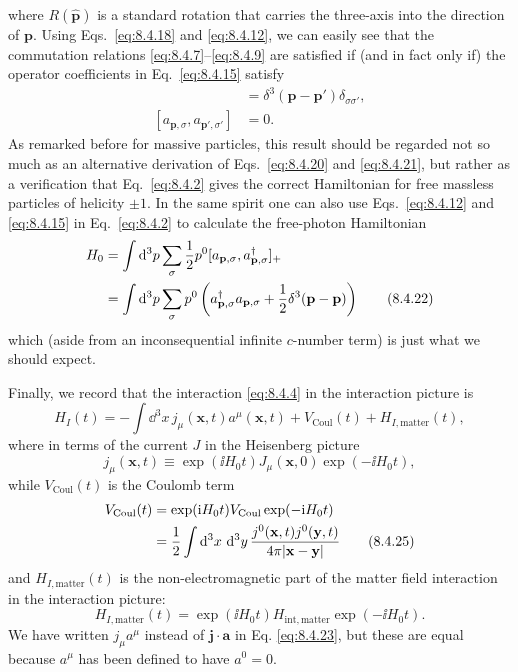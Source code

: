 where $R(\widehat{\mathbf p})$ is a standard rotation that carries the
three-axis into the direction of $\mathbf p$. Using Eqs.~\eqref{eq:8.4.18} and
\eqref{eq:8.4.12}, we can easily see that the commutation relations
\eqref{eq:8.4.7}--\eqref{eq:8.4.9} are satisfied if (and in fact only if) the operator
coefficients in Eq.~\eqref{eq:8.4.15} satisfy
\begin{align}
[a_{\mathbf p,\sigma},a^\dagger_{\mathbf p',\sigma'}]
&=\delta^3(\mathbf p-\mathbf p')\delta_{\sigma\sigma'},
\tag{8.4.20}\label{eq:8.4.20}\\
[a_{\mathbf p,\sigma},a_{\mathbf p',\sigma'}]&=0.
\tag{8.4.21}\label{eq:8.4.21}
\end{align}
As remarked before for massive particles, this result should be regarded not
so much as an alternative derivation of Eqs.~\eqref{eq:8.4.20} and \eqref{eq:8.4.21}, but rather
as a verification that Eq.~\eqref{eq:8.4.2} gives the correct Hamiltonian for free
massless particles of helicity $\mathord\pm1$. In the same spirit one can also
use Eqs.~\eqref{eq:8.4.12} and \eqref{eq:8.4.15} in Eq.~\eqref{eq:8.4.2} to calculate the free-photon
Hamiltonian
\begin{align}
H_0
&=\int \mathop{}\!\mathrm{d}^3p\sum_\sigma\frac12p^0
  [a_{\mathbf p,\sigma},a^\dagger_{\mathbf p,\sigma}]_+
\notag\\
&=\int \mathop{}\!\mathrm{d}^3p\sum_\sigma p^0
  \left(a^\dagger_{\mathbf p,\sigma}a_{\mathbf p,\sigma}
  +\frac12\delta^3(\mathbf p-\mathbf p)\right)
\tag{8.4.22}\label{eq:8.4.22}
\end{align}
which (aside from an inconsequential infinite $c$-number term) is just what we
should expect.

Finally, we record that the interaction \eqref{eq:8.4.4} in the interaction picture is
\begin{equation}
H_I(t)=-\int \dd^3x\,j_\mu(\mathbf x,t)a^\mu(\mathbf x,t)
 +V_{\mathrm{Coul}}(t)+H_{I,\mathrm{matter}}(t),
\tag{8.4.23}\label{eq:8.4.23}
\end{equation}
where in terms of the current $J$ in the Heisenberg picture
\begin{equation}
j_\mu(\mathbf x,t)\equiv
\exp(\ii H_0t)J_\mu(\mathbf x,0)\exp(-\ii H_0t),
\tag{8.4.24}\label{eq:8.4.24}
\end{equation}
while $V_{\mathrm{Coul}}(t)$ is the Coulomb term
\begin{align}
V_{\mathrm{Coul}}(t)
&=\exp(\mathrm{i} H_0t)V_{\mathrm{Coul}}\exp(-\mathrm{i} H_0t)
\notag\\
&=\frac12\int \mathop{}\!\mathrm{d}^3x\,\mathop{}\!\mathrm{d}^3y\,
  \frac{j^0(\mathbf x,t)j^0(\mathbf y,t)}
       {4\pi\lvert\mathbf x-\mathbf y\rvert}
\tag{8.4.25}\label{eq:8.4.25}
\end{align}
and $H_{I,\mathrm{matter}}(t)$ is the non-electromagnetic part of the matter
field interaction in the interaction picture:
\begin{equation}
H_{I,\mathrm{matter}}(t)=
\exp(\ii H_0t)H_{\mathrm{int,matter}}\exp(-\ii H_0t).
\tag{8.4.26}\label{eq:8.4.26}
\end{equation}
We have written $j_\mu a^\mu$ instead of $\mathbf j\cdot\mathbf a$ in Eq.
\eqref{eq:8.4.23}, but these are equal because $a^\mu$ has been defined to have
$a^0=0$.
